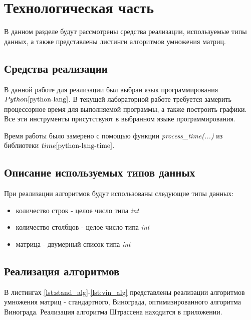 \chapter{Технологическая часть}

В данном разделе будут рассмотрены средства реализации, используемые типы данных, а также представлены листинги алгоритмов умножения матриц.

\section{Средства реализации}
В данной работе для реализации был выбран язык программирования $Python \cite{python-lang}$. В текущей лабораторной работе требуется замерить процессорное время для выполняемой программы, а также построить графики. Все эти инструменты присутствуют в выбранном языке программирования.

Время работы было замерено с помощью функции \textit{process\_time(...)} из библиотеки $time \cite{python-lang-time}$.

\section{Описание используемых типов данных}

При реализации алгоритмов будут использованы следующие типы данных:

\begin{itemize}
	\item количество строк - целое число типа \textit{int}
	\item количество столбцов - целое число типа \textit{int}
	\item матрица - двумерный список типа \textit{int}
\end{itemize}



\section{Реализация алгоритмов}

В листингах \ref{lst:stand_alg}-\ref{lst:vin_alg} представлены реализации алгоритмов умножения матриц - стандартного, Винограда, оптимизированного алгоритма Винограда. Реализация алгоритма Штрассена находится в приложении.

